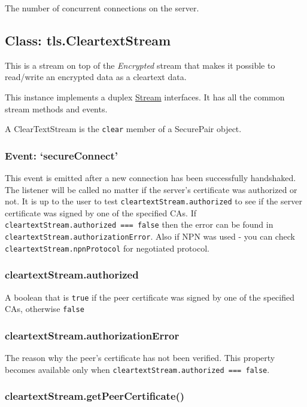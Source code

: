 The number of concurrent connections on the server.

\subsection{Class: tls.CleartextStream}

This is a stream on top of the \emph{Encrypted} stream that makes it
possible to read/write an encrypted data as a cleartext data.

This instance implements a duplex
\href{stream.html\#stream\_stream}{Stream} interfaces. It has all the
common stream methods and events.

A ClearTextStream is the \texttt{clear} member of a SecurePair object.

\subsubsection{Event: `secureConnect'}

This event is emitted after a new connection has been successfully
handshaked. The listener will be called no matter if the server's
certificate was authorized or not. It is up to the user to test
\texttt{cleartextStream.authorized} to see if the server certificate was
signed by one of the specified CAs. If
\texttt{cleartextStream.authorized === false} then the error can be
found in \texttt{cleartextStream.authorizationError}. Also if NPN was
used - you can check \texttt{cleartextStream.npnProtocol} for negotiated
protocol.

\subsubsection{cleartextStream.authorized}

A boolean that is \texttt{true} if the peer certificate was signed by
one of the specified CAs, otherwise \texttt{false}

\subsubsection{cleartextStream.authorizationError}

The reason why the peer's certificate has not been verified. This
property becomes available only when
\texttt{cleartextStream.authorized === false}.

\subsubsection{cleartextStream.getPeerCertificate()}

